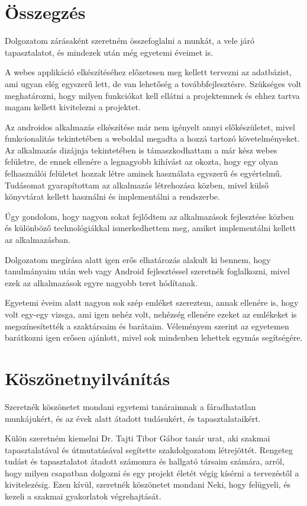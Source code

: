 \documentclass[
]{thesis-ekf}
\theoremstyle{definition}
\theoremstyle{remark}
\begin{document}
	\chapter{Összegzés}
	Dolgozatom zárásaként szeretném összefoglalni a munkát, a  vele járó tapasztalatot, és mindezek után még egyetemi éveimet is. 
	
	A webes applikáció elkészítéséhez előzetesen meg kellett tervezni az adatbázist, ami ugyan elég egyszerű lett, de van lehetőség a továbbfejlesztésre. Szükséges volt meghatározni, hogy milyen funkciókat kell ellátni a projektemnek és ehhez tartva magam kellett kivitelezni a projektet. 
	
	Az androidos alkalmazás elkészítése már nem igényelt annyi előkészületet, mivel funkcionalitás tekintetében a weboldal megadta a hozzá tartozó követelményeket. Az alkalmazás dizájnja tekintetében is támaszkodhattam a már kész webes felületre, de ennek ellenére a legnagyobb kihívást az okozta, hogy egy olyan felhasználói felületet hozzak létre aminek használata egyszerű és egyértelmű. Tudásomat gyarapítottam az alkalmazás létrehozása közben, mivel külső könyvtárat kellett használni és implementálni a rendszerbe.
	
	Úgy gondolom, hogy nagyon sokat fejlődtem az alkalmazások fejlesztése közben és különböző technológiákkal ismerkedhettem meg, amiket implementálni kellett az alkalmazásban. 
	
	Dolgozatom megírása alatt igen erős elhatározás alakult ki bennem, hogy tanulmányaim után web vagy Android fejlesztéssel szeretnék foglalkozni, mivel ezek az alkalmazások egyre nagyobb teret hódítanak. 
	
	Egyetemi éveim alatt nagyon sok szép emléket szereztem, annak ellenére is, hogy volt egy-egy vizsga, ami igen nehéz volt, nehézség ellenére ezeket az emlékeket is megszínesítették a szaktársaim és barátaim. Véleményem szerint az egyetemen barátkozni igen erősen ajánlott, mivel sok mindenben lehettek egymás segítségére. 
	
	\chapter{Köszönetnyilvánítás}
	Szeretnék köszönetet mondani egyetemi tanáraimnak a fáradhatatlan munkájukért, és az évek alatt átadott tudásukért, és tapasztalataikért. 
	
	Külön szeretném kiemelni Dr. Tajti Tibor Gábor tanár urat, aki szakmai tapasztalatával és útmutatásával segítette szakdolgozatom létrejöttét. Rengeteg tudást és tapasztalatot átadott számomra és hallgató társaim számára, arról, hogy milyen csapatban dolgozni és egy projekt életét végig kísérni a tervezéstől a kivitelezésig. Ezen kívül, szeretnék köszönetet mondani Neki, hogy felügyeli, és kezeli a szakmai gyakorlatok végrehajtását. 
	
\end{document}
